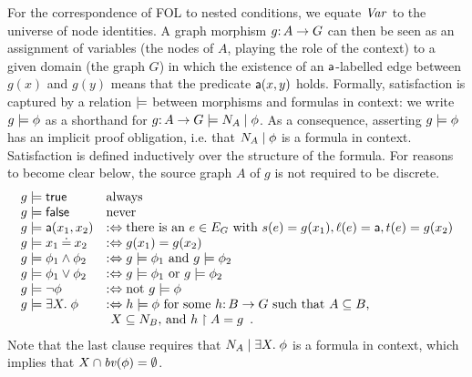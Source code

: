 For the correspondence of FOL to nested conditions, we equate $\mathit{Var}$ to the universe of node identities. A graph morphism $g{:}\, A\rightarrow G$ can then be seen as an assignment of variables (the nodes of $A$, playing the role of the context) to a given domain (the graph $G$) in which the existence of an $\mathsf{a}$-labelled edge between $g(x)$ and $g(y)$ means that the predicate $\mathsf{a}(x,y)$ holds. Formally, satisfaction is captured by a relation $\models$ between morphisms and formulas in context: we write $g \models \phi$ as a shorthand for $g {:}\, A \rightarrow G \models {N_A} \mid {\phi}$. As a consequence, asserting $g \models \phi$ has an implicit proof obligation, i.e. that ${N_A} \mid {\phi}$ is a formula in context.  Satisfaction is defined inductively over the structure of the formula.
For reasons to become clear below, the source graph $A$ of $g$ is not required to be discrete.
%
\[\begin{array}{ll}
g\models \mathsf{true} & \text{always} \\
g\models \mathsf{false} & \text{never} \\
g\models \mathsf{a}(x_1,x_2) & :\Leftrightarrow \text{there is an } e\in E_G \text{ with } s(e)=g(x_1), \ell(e)=\mathsf{a}, t(e)=g(x_2) \\
g\models x_1\mathbin{\doteq} x_2 & :\Leftrightarrow g(x_1)=g(x_2) \\
g\models \phi_1\wedge \phi_2 & :\Leftrightarrow g\models \phi_1 \text{ and } g\models \phi_2 \\
g\models \phi_1\vee \phi_2 & :\Leftrightarrow g\models \phi_1 \text{ or } g\models \phi_2 \\
g\models \neg\phi & :\Leftrightarrow \text{not } g\models \phi \\
g\models \exists X.\; \phi  & :\Leftrightarrow h\models \phi \text{ for some $h{:}\, B \rightarrow G$ such that $A \subseteq B$,}\\
& \text{ $X \subseteq N_B$, and }  h\restriction A = g\enspace.
\end{array}\]
%
Note that the last clause requires that ${N_A} \mid {\exists X.\;\phi}$ is a formula in context, which implies that $X \cap \mathit{bv}(\phi) = \emptyset$.

